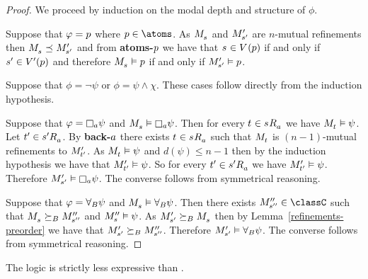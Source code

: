 \begin{proof}
    We proceed by induction on the modal depth and structure of $\phi$.

    Suppose that $\varphi = p$ where $\atomP \in \atoms$. 
    As $\kPModel{\kStateS}$ and ${M^{\prime}_{{s}^{\prime}}}$ are $n$-mutual refinements
    then $\kPModel{\kStateS} \refines \kPModelP{\kStateSP}$ 
    and from {\bf atoms-$p$} we have that $\kStateS \in \kValuation(\atomP)$ if and only if ${s}^{\prime} \in {V^{\prime}}(p)$
    and therefore $\kPModel{\kStateS} \entails \atomP$ if and only if ${M^{\prime}_{{s}^{\prime}}} \vDash p$.

    Suppose that $\phi = \neg \psi$ or $\phi = \psi \land \chi$.
    These cases follow directly from the induction hypothesis.

    Suppose that $\phi = \necessaryA \psi$ and $\kPModel{\kStateS} \entails \necessaryA \psi$.
    Then for every $\kStateT \in \kStateS \kAccessibility{\agentA}$ we have $\kPModel{\kStateT} \entails \psi$.
    Let $\kStateTP \in \kStateSP \kAccessibility{\agentA}$.
    By {\bf back-$a$} there exists $\kStateT \in \kStateS \kAccessibility{\agentA}$ 
    such that $\kPModel{\kStateT}$ is $(n-1)$-mutual refinements to ${M^{\prime}_{{t}^{\prime}}}$.
    As $\kPModel{\kStateT} \entails \psi$ and $d(\psi) \leq n - 1$ then
    by the induction hypothesis we have that ${M^{\prime}_{{t}^{\prime}}} \vDash \psi$.
    So for every $\kStateTP \in \kSuccessorsA{\kStateSP}$ we have ${M^{\prime}_{{t}^{\prime}}} \vDash \psi$.
    Therefore $\kPModelP{\kStateSP} \entails \necessaryA \psi$.
    The converse follows from symmetrical reasoning.

    Suppose that $\varphi = {\forall_{B}} \psi$ and $\kPModel{\kStateS} \entails \allrefsBs \psi$.
    Then there exists $\kPModelPP{\kStateSPP} \in \classC$ such that $\kPModel{\kStateS} \simulatesBs \kPModelPP{\kStateSPP}$ and $\kPModelPP{\kStateS} \entails \psi$.
    As $\kPModelP{\kStateSP} \simulatesBs \kPModel{\kStateS}$ then by Lemma~\ref{refinements-preorder} we have that ${M^{\prime}_{{s}^{\prime}}} \succeq_{B} {M^{\prime\prime}_{{s}^{\prime\prime}}}$.
    Therefore ${M^{\prime}_{{s}^{\prime}}} \vDash {\forall_{B}} \psi$.
    The converse follows from symmetrical reasoning.
\end{proof}

\begin{theorem}
The logic \logicRmlKF{} is strictly less expressive than \logicTangleKF{}.
\end{theorem}

